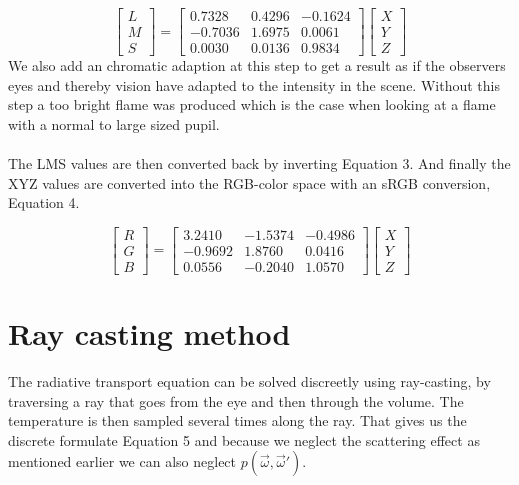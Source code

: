 \begin{equation}
	\begin{bmatrix}
       L          \\
       M \\
       S
     \end{bmatrix} =
 	\begin{bmatrix}
       0.7328 & 0.4296 & -0.1624 \\
     -0.7036 & 1.6975 &  0.0061 \\
0.0030 & 0.0136 & 0.9834
     \end{bmatrix}
\begin{bmatrix}
      X          \\
       Y \\
       Z
     \end{bmatrix}
\end{equation}
We also add an chromatic adaption at this step to get a result as if the observers eyes and thereby vision have adapted to the intensity in the scene. Without this step a too bright flame was produced which is the case when looking at a flame with a normal to large sized pupil. \\\\
The LMS values are then converted back by inverting Equation 3. And finally the XYZ values are converted into the RGB-color space with an sRGB conversion, Equation 4\cite{sRGB}.

\begin{equation}
	\begin{bmatrix}
      R          \\
       G \\
       B
     \end{bmatrix} =
 	\begin{bmatrix}
      3.2410	& -1.5374	&  -0.4986 \\
	 -0.9692 & 1.8760	&  0.0416 \\
	 0.0556 & -0.2040	& 1.0570
     \end{bmatrix}
\begin{bmatrix}
      X          \\
       Y \\
       Z
     \end{bmatrix}
\end{equation}

\section{Ray casting method}
The radiative transport equation can be solved discreetly using ray-casting, by traversing a ray that goes from the eye and then through the volume. The temperature is then sampled several times along the ray. That gives us the discrete formulate Equation 5\cite{Nguyen02} and because we neglect the scattering effect as mentioned earlier we can also neglect $ p(\vec{\omega},\vec{\omega}')$.

